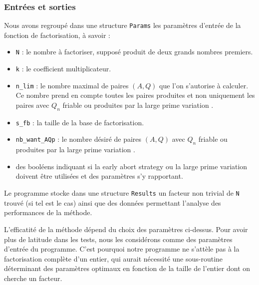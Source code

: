 \subsubsection{Entrées et sorties}
Nous avons regroupé dans une structure \texttt{Params} les paramètres d'entrée 
de la fonction de factorisation, à savoir :

\begin{itemize}
    \item \texttt{N} : le nombre à factoriser, supposé produit de deux grands
                       nombres premiers.
    \item \texttt{k} : le coefficient multiplicateur.
    \item \texttt{n\_lim} : le nombre maximal de paires $(A,Q)$ que l'on 
                             s'autorise à calculer. Ce nombre prend en compte
                             toutes les paires produites et non uniquement les
                             paires avec $Q_n$ friable ou produites par la \og 
                             large prime variation \fg{}.
    \item \texttt{s\_fb} : la taille de la base de factorisation. 
    \item \texttt{nb\_want\_AQp} : le nombre désiré de paires $(A,Q)$ avec $Q_n$ 
                                 friable ou produites par la \og large prime 
                                 variation \fg{}.
    \item des booléens indiquant si la \og early abort strategy \fg{} ou la 
          \og large prime variation \fg{} doivent être utilisées et des paramètres
          s'y rapportant.

\end{itemize}

Le programme stocke dans une structure \texttt{Results} un facteur non trivial
de \texttt{N} trouvé (si tel est le cas) ainsi que des données permettant 
l'analyse des performances de la méthode.  

\begin{remarque}
L'efficatité de la méthode dépend du choix des paramètres ci-dessus. Pour avoir
plus de latitude dans les tests, nous les considérons comme des paramètres 
d'entrée du programme. C'est pourquoi notre programme ne s'attèle pas à la
factorisation complète d'un entier, qui aurait nécessité une sous-routine 
déterminant des paramètres optimaux en fonction de la taille de l'entier 
dont on cherche un facteur. 
   
\end{remarque}

